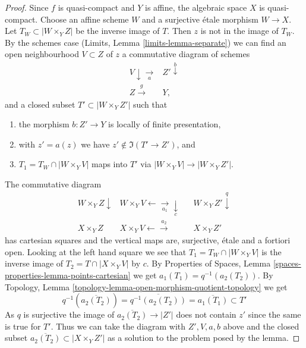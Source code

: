 \begin{proof}
\medskip\noindent
Since $f$ is quasi-compact and $Y$ is affine, the algebraic space
$X$ is quasi-compact. Choose an affine scheme $W$ and a surjective
\'etale morphism $W \to X$. Let $T_W \subset |W \times_Y Z|$
be the inverse image of $T$. Then $z$ is not in the image of
$T_W$. By the schemes case (Limits, Lemma \ref{limits-lemma-separate})
we can find an open neighbourhood $V \subset Z$ of $z$
a commutative diagram of schemes
$$
\begin{array}{cc}V \downarrow\underset{a}{\longrightarrow} & Z' \overset{b}{\downarrow} \\ Z \overset{g}{\longrightarrow} & Y,\end{array}
$$
and a closed subset $T' \subset |W \times_Y Z'|$ such that
\begin{enumerate}
\item the morphism $b : Z' \to Y$ is locally of finite presentation,
\item with $z' = a(z)$ we have $z' \not \in \Im(T' \to Z')$, and
\item $T_1 = T_W \cap |W \times_Y V|$ maps into $T'$ via
$|W \times_Y V| \to |W \times_Y Z'|$.
\end{enumerate}
The commutative diagram
$$
\begin{array}{cccc}W \times_Y Z \downarrow & W \times_Y V \longleftarrow\underset{a_1}{\longrightarrow}\underset{c}{\downarrow} &  & W \times_Y Z' \overset{q}{\downarrow} \\ X \times_Y Z & X \times_Y V \longleftarrow\overset{a_2}{\longrightarrow} &  & X \times_Y Z'\end{array}
$$
has cartesian squares and the vertical maps are, surjective, \'etale
and a fortiori open. Looking at the left hand square we
see that $T_1 = T_W \cap |W \times_Y V|$ is the inverse image of
$T_2 = T \cap |X \times_Y V|$ by $c$. By Properties of Spaces, Lemma
\ref{spaces-properties-lemma-points-cartesian} we get
$a_1(T_1) = q^{-1}(a_2(T_2))$.
By Topology, Lemma \ref{topology-lemma-open-morphism-quotient-topology}
we get
$$
q^{-1}\left(\overline{a_2(T_2)}\right) =
\overline{q^{-1}(a_2(T_2))} =
\overline{a_1(T_1)} \subset T'
$$
As $q$ is surjective the image of $\overline{a_2(T_2)} \to |Z'|$
does not contain $z'$ since the same is true for $T'$.
Thus we can take the diagram with $Z', V, a, b$ above and the
closed subset $\overline{a_2(T_2)} \subset |X \times_Y Z'|$ as
a solution to the problem posed by the lemma.
\end{proof}

